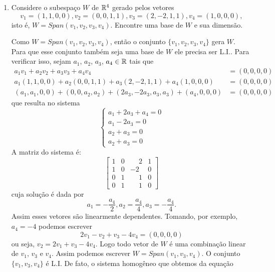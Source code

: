 \begin{exemplos}
  \begin{enumerate}
    \item Considere o subespaço $W$ de $\mathbb{R}^4$ gerado pelos vetores
      \[
        v_1 = (1, 1, 0, 0), v_2 = (0, 0, 1, 1), v_3 = (2, -2, 1, 1), v_4 = (1, 0, 0, 0),
      \]
      isto é, $W = Span(v_1, v_2, v_3, v_4)$. Encontre uma base de $W$ e sua dimensão.
      \begin{solucao}
        Como $W = Span(v_1, v_2, v_3, v_4)$, então o conjunto $\{v_1, v_2, v_3, v_4\}$ gera $W$. Para que esse conjunto também seja uma base de $W$ ele precisa ser L.I.. Para verificar isso, sejam $a_1$, $a_2$, $a_3$, $a_4 \in \mathbb{R}$ tais que
        \begin{align*}
          a_1v_1 + a_2v_2 + a_3v_3 + a_4v_4 &= (0, 0, 0, 0)\\
          a_1(1, 1, 0, 0) + a_2(0, 0, 1, 1) + a_3(2, -2, 1, 1) + a_4(1, 0, 0, 0) &= (0, 0, 0, 0)\\
          (a_1, a_1, 0, 0) + (0, 0, a_2, a_2) + (2a_3, -2a_3, a_3, a_3) + (a_4, 0, 0, 0) &= (0, 0, 0, 0)
        \end{align*}
        que resulta no sistema
        \[
          \begin{cases}
            a_1 + 2a_3 + a_4 = 0\\
            a_1 - 2a_3 = 0\\
            a_2 + a_3 = 0\\
            a_2 + a_3 = 0
          \end{cases}
        \]
        A matriz do sistema é:
        \[
          \begin{bmatrix}
            1 & 0 & \phantom{-}2 & 1\\
            1 & 0 & -2 & 0\\
            0 & 1 & \phantom{-}1 & 0\\
            0 & 1 & \phantom{-}1 & 0
          \end{bmatrix}
        \]
        cuja solução é dada por
        \[
          a_1 = -\dfrac{a_4}{2}, a_2 = \dfrac{a_4}{4}, a_3 = -\dfrac{a_4}{4}.
        \]
        Assim esses vetores são linearmente dependentes. Tomando, por exemplo, $a_4 = -4$ podemos escrever
        \[
          2v_1 - v_2 + v_3 - 4v_4 = (0, 0, 0, 0)
        \]
        ou seja, $v_2 = 2v_1 + v_3 - 4v_4$. Logo todo vetor de $W$ é uma combinação linear de $v_1$, $v_3$ e $v_4$. Assim podemos escrever $W = Span(v_1, v_3, v_4)$. O conjunto $\{v_1, v_3, v_4\}$ é L.I. De fato, o sistema homogêneo que obtemos da equação

\end{solucao}
\end{enumerate}
\end{exemplos}
